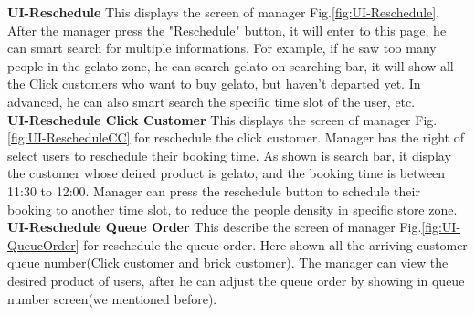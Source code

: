 \documentclass[a4paper,12pt]{report}
\begin{document}
\textbf{UI-Reschedule} This displays the screen of manager Fig.\ref{fig:UI-Reschedule}. After the manager press the "Reschedule" button, it will enter to this page, he can smart search for multiple informations. For example, if he saw too many people in the gelato zone, he can search gelato on searching bar, it will show all the Click customers who want to buy gelato, but haven't departed yet. In advanced, he can also smart search the specific time slot of the user, etc. ~\\  

\textbf{UI-Reschedule Click Customer} This displays the screen of manager Fig.\ref{fig:UI-RescheduleCC} for reschedule the click customer. Manager has the right of select users to reschedule their booking time.  As shown is search bar, it display the customer whose deired product is gelato, and the booking time is between 11:30 to 12:00. Manager can press the reschedule button to schedule their booking to another time slot, to reduce the people density in specific store zone. ~\\ 
 
\textbf{UI-Reschedule Queue Order} This describe the screen of manager Fig.\ref{fig:UI-QueueOrder} for reschedule the queue order. Here shown all the arriving customer queue number(Click customer and brick customer). The manager can view the desired product of users, after he can adjust the queue order by showing in queue number screen(we mentioned before).~\\
\end{document}
